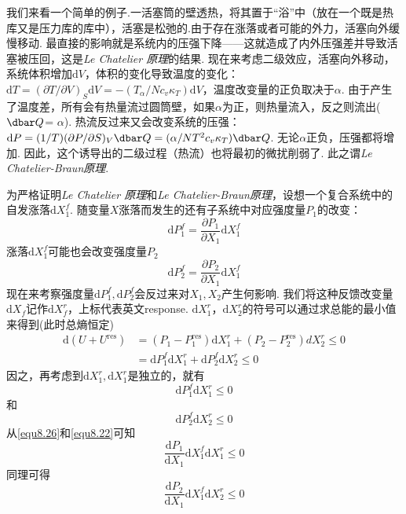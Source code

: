 我们来看一个简单的例子.一活塞筒的壁透热，将其置于“浴”中（放在一个既是热库又是压力库的库中），活塞是松弛的.由于存在涨落或者可能的外力，活塞向外缓慢移动. 最直接的影响就是系统内的压强下降——这就造成了内外压强差并导致活塞被压回，这是\textsl{Le Chatelier 原理}的结果. 现在来考虑二级效应，活塞向外移动，系统体积增加$\text{d}V$，体积的变化导致温度的变化：$\text{d}T=(\partial T/\partial V)_S\text{d}V=-(T_\alpha/Nc_v\kappa_T)\text{d}V$，温度改变量的正负取决于$\alpha$. 由于产生了温度差，所有会有热量流过圆筒壁，如果$\alpha$为正，则热量流入，反之则流出( $\dbar Q$= $\alpha$). 热流反过来又会改变系统的压强：$\text{d}P=(1/T)(\partial P/\partial S)_V\dbar Q=(\alpha/NT^2c_v\kappa_T)\dbar Q$.  无论$\alpha$正负，压强都将增加. 因此，这个诱导出的二级过程（热流）也将最初的微扰削弱了. 此之谓\textsl{Le Chatelier-Braun原理}.

为严格证明\textsl{Le Chatelier 原理}和\textsl{Le Chatelier-Braun原理}，设想一个复合系统中的自发涨落$\text{d}X^f_1 $. 随变量$X$涨落而发生的还有子系统中对应强度量$P_1$的改变：
\begin{equation}
\label{equ8.22}
\text{d}P_1^f= \frac{\partial P_1}{\partial X_1}\text{d}X_1^f 
\end{equation}
涨落$\text{d}X_1^f $可能也会改变强度量$P_2$
\begin{equation}
\label{equ8.23}
\text{d}P_2^f= \frac{\partial P_2}{\partial X_1}\text{d}X_1^f 
\end{equation}
现在来考察强度量$\text{d}P_1^f, \text{d}P_2^f$会反过来对$X_1, X_2$产生何影响. 我们将这种反馈改变量$\text{d}X_f $记作$\text{d}X_f^r$，上标代表英文response. $\text{d}X_1^r， \text{d}X_2^r$的符号可以通过求总能的最小值来得到(此时总熵恒定)
\begin{eqnarray}
\label{equ8.24}
\text{d}(U+U^\text{res})&=(P_1-P_1^\text{res})\text{d}X_1^r+(P_2-P_2^\text{res}){d}X_2^r\leq 0\\
&=\text{d}P_1^f\text{d}X_1^r+\text{d}P_2^f\text{d}X_2^r\leq 0
\end{eqnarray}
因之，再考虑到$\text{d}X_1^r, \text{d}X_1^r$是独立的，就有
\begin{equation}
\label{equ8.26}
\text{d}P_1^f\text{d}X_1^r\leq 0
\end{equation}
和
\begin{equation}
\label{equ8.27}
\text{d}P_2^f\text{d}X_2^r\leq 0
\end{equation}
从\ref{equ8.26}和\ref{equ8.22}可知
\begin{equation}
\label{equ8.28}
\frac{\text{d}P_1}{\text{d}X_1}\text{d}X_1^f\text{d}X_1^r\le 0
\end{equation}
同理可得
\begin{equation}
\label{equ8.29}
\frac{\text{d}P_2}{\text{d}X_1}\text{d}X_1^f\text{d}X_2^r\le 0
\end{equation}

